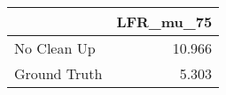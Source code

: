 \begin{tabular}{lr}
\toprule
{} & LFR_mu_75 \\
\midrule
No Clean Up  &    10.966 \\
Ground Truth &     5.303 \\
\bottomrule
\end{tabular}
